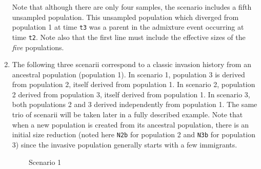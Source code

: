 \begin{enumerate}
Note that although there are only four samples, the scenario includes
a fifth unsampled population. This unsampled population which diverged
from population 1 at time \texttt{t3} was a parent in the admixture
event occurring at time \texttt{t2}. Note also that the first line
must include the effective sizes of the \emph{five} populations.\\


\item The following three scenarii correspond to a classic invasion history
from an ancestral population (population 1). In scenario 1, population
3 is derived from population 2, itself derived from population 1.
In scenario 2, population 2 derived from population 3, itself derived
from population 1. In scenario 3, both populations 2 and 3 derived
independently from population 1. The same trio of scenarii will be
taken later in a fully described example. Note that when a new population
is created from its ancestral population, there is an initial size
reduction (noted here \texttt{N2b} for population 2 and \texttt{N3b}
for population 3) since the invasive population generally starts with
a few immigrants.
\end{enumerate}
\medskip{}
\ \ \ \ \ \ \ \ Scenario 1

